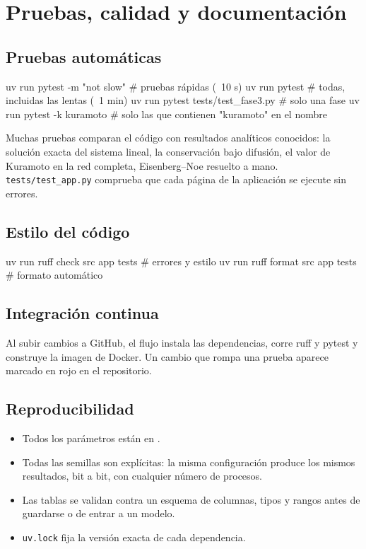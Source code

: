 \chapter{Pruebas, calidad y documentación}

\section{Pruebas automáticas}
\begin{terminal}
uv run pytest -m "not slow"          # pruebas rápidas (~10 s)
uv run pytest                        # todas, incluidas las lentas (~1 min)
uv run pytest tests/test_fase3.py    # solo una fase
uv run pytest -k kuramoto            # solo las que contienen "kuramoto" en el nombre
\end{terminal}
Muchas pruebas comparan el código con resultados analíticos conocidos: la solución
exacta del sistema lineal, la conservación bajo difusión, el valor de Kuramoto en la red
completa, Eisenberg–Noe resuelto a mano. \texttt{tests/test\_app.py} comprueba que cada
página de la aplicación se ejecute sin errores.

\section{Estilo del código}
\begin{terminal}
uv run ruff check src app tests          # errores y estilo
uv run ruff format src app tests         # formato automático
\end{terminal}

\section{Integración continua}
Al subir cambios a GitHub, el flujo  instala las
dependencias, corre ruff y pytest y construye la imagen de Docker. Un cambio que rompa
una prueba aparece marcado en rojo en el repositorio.

\section{Reproducibilidad}
\begin{itemize}
\item Todos los parámetros están en .
\item Todas las semillas son explícitas: la misma configuración produce los mismos
resultados, bit a bit, con cualquier número de procesos.
\item Las tablas se validan contra un esquema de columnas, tipos y rangos antes de
guardarse o de entrar a un modelo.
\item \texttt{uv.lock} fija la versión exacta de cada dependencia.
\end{itemize}

